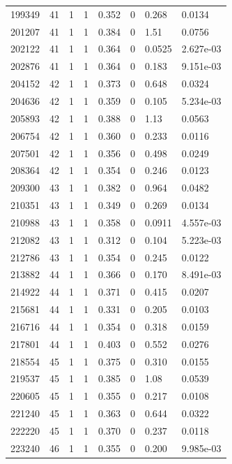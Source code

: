 \documentclass[preview]{standalone}
\begin{document}
{{{{{{{{{{{{{{{{{\begin{tabular}{L{1.2cm}C{1.2cm} C{0.3cm}C{0.5cm} C{1.4cm}C{1.4cm} C{1.4cm}C{1.4cm}}
  199349  &    41  & 1     &  1 &  0.352  & 0  & 0.268 &  0.0134   \\ 
  201207  &    41  & 1     &  1 &  0.384  & 0  & 1.51 &  0.0756   \\ 
  202122  &    41  & 1     &  1 &  0.364  & 0  & 0.0525 &  2.627e-03   \\ 
  202876  &    41  & 1     &  1 &  0.364  & 0  & 0.183 &  9.151e-03   \\ 
  204152  &    42  & 1     &  1 &  0.373  & 0  & 0.648 &  0.0324   \\ 
  204636  &    42  & 1     &  1 &  0.359  & 0  & 0.105 &  5.234e-03   \\ 
  205893  &    42  & 1     &  1 &  0.388  & 0  & 1.13 &  0.0563   \\ 
  206754  &    42  & 1     &  1 &  0.360  & 0  & 0.233 &  0.0116   \\ 
  207501  &    42  & 1     &  1 &  0.356  & 0  & 0.498 &  0.0249   \\ 
  208364  &    42  & 1     &  1 &  0.354  & 0  & 0.246 &  0.0123   \\ 
  209300  &    43  & 1     &  1 &  0.382  & 0  & 0.964 &  0.0482   \\ 
  210351  &    43  & 1     &  1 &  0.349  & 0  & 0.269 &  0.0134   \\ 
  210988  &    43  & 1     &  1 &  0.358  & 0  & 0.0911 &  4.557e-03   \\ 
  212082  &    43  & 1     &  1 &  0.312  & 0  & 0.104 &  5.223e-03   \\ 
  212786  &    43  & 1     &  1 &  0.354  & 0  & 0.245 &  0.0122   \\ 
  213882  &    44  & 1     &  1 &  0.366  & 0  & 0.170 &  8.491e-03   \\ 
  214922  &    44  & 1     &  1 &  0.371  & 0  & 0.415 &  0.0207   \\ 
  215681  &    44  & 1     &  1 &  0.331  & 0  & 0.205 &  0.0103   \\ 
  216716  &    44  & 1     &  1 &  0.354  & 0  & 0.318 &  0.0159   \\ 
  217801  &    44  & 1     &  1 &  0.403  & 0  & 0.552 &  0.0276   \\ 
  218554  &    45  & 1     &  1 &  0.375  & 0  & 0.310 &  0.0155   \\ 
  219537  &    45  & 1     &  1 &  0.385  & 0  & 1.08 &  0.0539   \\ 
  220605  &    45  & 1     &  1 &  0.355  & 0  & 0.217 &  0.0108   \\ 
  221240  &    45  & 1     &  1 &  0.363  & 0  & 0.644 &  0.0322   \\ 
  222220  &    45  & 1     &  1 &  0.370  & 0  & 0.237 &  0.0118   \\ 
  223240  &    46  & 1     &  1 &  0.355  & 0  & 0.200 &  9.985e-03   \\ 
\hline 
\end{tabular} 

}}}}}}}}}}}}}}}}}
\end{document}

